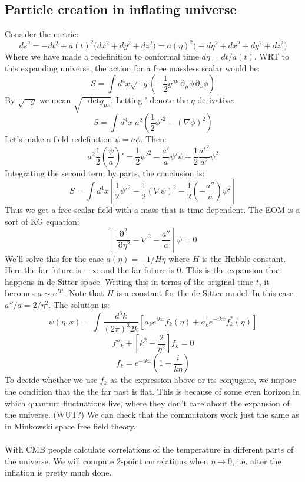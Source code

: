 \documentclass[12 pt]{article}
\DeclareMathOperator {\p} {\partial}
\begin{document}
\subsection*{Particle creation in inflating universe}
Consider the metric:
\[     ds^2 = - dt^2 + a(t)^2 \big(dx^2 + dy^2 + dz^2\big)   = a(\eta)^2 \big(  - d\eta^2 + dx^2 + dy^2 + dz^2  \big)   \]
Where we have made a redefinition to conformal time $d\eta = dt/ a(t) $. WRT to this expanding universe, the action for a free massless scalar would be:
\[      S = \int d^4x \sqrt{-g} \left( - \frac{1}{2} g^{\mu\nu} \p_{\mu} \phi \p_{\nu} \phi \right)      \]
By $\sqrt{-g}$ we mean $\sqrt{-\text{det}g_{\mu \nu}}$. Letting ' denote the $\eta$ derivative:
\[      S = \int d^4 x\; a^2 \left(  \frac{1}{2} \phi'^2 - (\nabla \phi)^2   \right)        \]
Let's make a field redefinition $\psi = a\phi$. Then:
\[     a^2 \frac{1}{2} \left(\frac{\psi}{a} \right)' = \frac{1}{2} \psi'^2 - \frac{a'}{a} \psi' \psi + \frac{1}{2} \frac{a'^2}{a^2} \psi^2     \]
Integrating the second term by parts, the conclusion is:
\[     S = \int d^4 x \left[  \frac{1}{2} \psi'^2 - \frac{1}{2} (\nabla \psi)^2 - \frac{1}{2} \left(  - \frac{a''}{a} \right) \psi^2   \right]    \]
Thus we get a free scalar field with a mass that is time-dependent. The EOM is a sort of KG equation:
\[ \left[    \frac{\p^2}{\p \eta^2} - \nabla^2 - \frac{a''}{a}    \right] \psi = 0    \]
We'll solve this for the case $a(\eta) = -1/ H\eta$ where $H$ is the Hubble constant. Here the far future is $-\infty$ and the far future is $0$. This is the expansion that happens in de Sitter space. Writing this in terms of the original time $t$, it becomes $a \sim e^{Ht}$. Note that $H$ is a constant for the de Sitter model. In this case $a''/a = 2/\eta^2$. The solution is:
\[      \psi (\eta, x) = \int \frac{d^3 k}{(2\pi)^3 2k} \left[  a_k e^{ikx} f_k (\eta) + a^{\dagger}_k e^{-ikx} f_k^* (\eta)  \right]     \]
\[       f''_k + \left[k^2 - \frac{2}{\eta^2} \right] f_k = 0       \]
\[          f_k = e^{-ikx} \left( 1 - \frac{i}{k\eta}  \right)      \]
To decide whether we use $f_k$ as the expression above or its conjugate, we impose the condition that the the far past is flat. This is because of some even horizon in which quantum fluctuations live, where they don't care about the expansion of the universe. (WUT?) We can check that the commutators work just the same as in Minkowski space free field theory.
\\
\\
With CMB people calculate correlations of the temperature in different parts of the universe. We will compute 2-point correlations when $\eta \to 0$, i.e. after the inflation is pretty much done.
\end{document}
